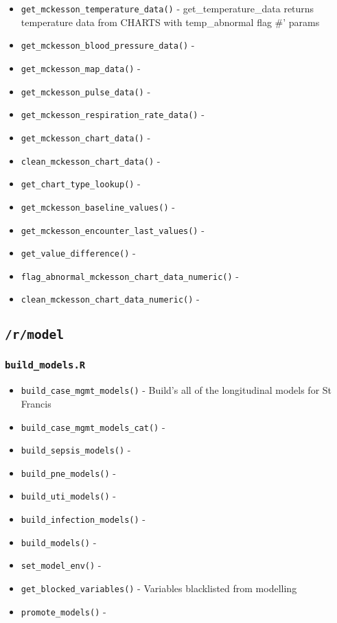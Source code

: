 \documentclass[
]{book}
\providecommand{\tightlist}{%
  \setlength{\itemsep}{0pt}\setlength{\parskip}{0pt}}
\begin{document}
\begin{itemize}
\tightlist
\item
  \texttt{get\_mckesson\_temperature\_data()} - get\_temperature\_data returns temperature data from CHARTS with temp\_abnormal flag \#' \citet{param} params
\item
  \texttt{get\_mckesson\_blood\_pressure\_data()} -
\item
  \texttt{get\_mckesson\_map\_data()} -
\item
  \texttt{get\_mckesson\_pulse\_data()} -
\item
  \texttt{get\_mckesson\_respiration\_rate\_data()} -
\item
  \texttt{get\_mckesson\_chart\_data()} -
\item
  \texttt{clean\_mckesson\_chart\_data()} -
\item
  \texttt{get\_chart\_type\_lookup()} -
\item
  \texttt{get\_mckesson\_baseline\_values()} -
\item
  \texttt{get\_mckesson\_encounter\_last\_values()} -
\item
  \texttt{get\_value\_difference()} -
\item
  \texttt{flag\_abnormal\_mckesson\_chart\_data\_numeric()} -
\item
  \texttt{clean\_mckesson\_chart\_data\_numeric()} -
\end{itemize}

\hypertarget{rmodel-1}{%
\subsection{\texorpdfstring{\texttt{/r/model}}{/r/model}}\label{rmodel-1}}

\hypertarget{build_models.r}{%
\subsubsection{\texorpdfstring{\texttt{build\_models.R}}{build\_models.R}}\label{build_models.r}}

\begin{itemize}
\tightlist
\item
  \texttt{build\_case\_mgmt\_models()} - Build's all of the longitudinal models for St Francis
\item
  \texttt{build\_case\_mgmt\_models\_cat()} -
\item
  \texttt{build\_sepsis\_models()} -
\item
  \texttt{build\_pne\_models()} -
\item
  \texttt{build\_uti\_models()} -
\item
  \texttt{build\_infection\_models()} -
\item
  \texttt{build\_models()} -
\item
  \texttt{set\_model\_env()} -
\item
  \texttt{get\_blocked\_variables()} - Variables blacklisted from modelling
\item
  \texttt{promote\_models()} -
\end{itemize}
\end{document}
